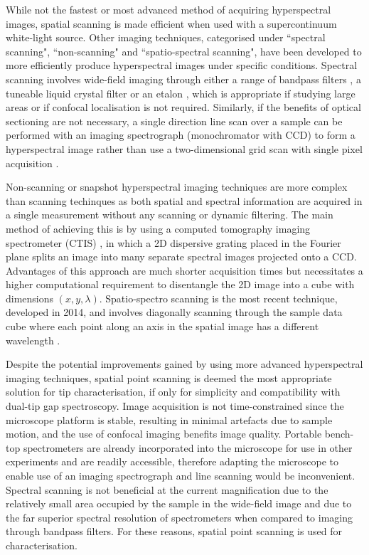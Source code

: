 \documentclass{article}
\begin{document}
While not the fastest or most advanced method of acquiring hyperspectral images, spatial scanning is made efficient when used with a supercontinuum white-light source. Other imaging techniques, categorised under ``spectral scanning", ``non-scanning" and ``spatio-spectral scanning", have been developed to more efficiently produce hyperspectral images under specific conditions.
Spectral scanning involves wide-field imaging through either a range of bandpass filters \cite{iga2012development}, a tuneable liquid crystal filter \cite{slawson1999hyperspectral, gat2000imaging} or an etalon \cite{daly2000tunable}, which is appropriate if studying large areas or if confocal localisation is not required. Similarly, if the benefits of optical sectioning are not necessary, a single direction line scan over a sample can be performed with an imaging spectrograph (monochromator with CCD) to form a hyperspectral image rather than use a two-dimensional grid scan with single pixel acquisition \cite{schultz2001hyperspectral}.

Non-scanning or snapshot hyperspectral imaging techniques are more complex than scanning techinques as both spatial and spectral information are acquired in a single measurement without any scanning or dynamic filtering. The main method of achieving this is by using a computed tomography imaging spectrometer (CTIS) \cite{okamoto1991simultaneous, bulygin1992spectrotomography, okamoto1993simultaneous, descour1995computed}, in which a 2D dispersive grating placed in the Fourier plane splits an image into many separate spectral images projected onto a CCD. Advantages of this approach are much shorter acquisition times but necessitates a higher computational requirement to disentangle the 2D image into a cube with dimensions $(x,y,\lambda)$.
Spatio-spectro scanning is the most recent technique, developed in 2014, and involves diagonally scanning through the sample data cube where each point along an axis in the spatial image has a different wavelength \cite{grusche2014basic}. %

Despite the potential improvements gained by using more advanced hyperspectral imaging techniques, spatial point scanning is deemed the most appropriate solution for tip characterisation, if only for simplicity and compatibility with dual-tip gap spectroscopy. Image acquisition is not time-constrained since the microscope platform is stable, resulting in minimal artefacts due to sample motion, and the use of confocal imaging benefits image quality. Portable bench-top spectrometers are already incorporated into the microscope for use in other experiments and are readily accessible, therefore adapting the microscope to enable use of an imaging spectrograph and line scanning would be inconvenient. Spectral scanning is not beneficial at the current magnification due to the relatively small area occupied by the sample in the wide-field image and due to the far superior spectral resolution of spectrometers when compared to imaging through bandpass filters. For these reasons, spatial point scanning is used for characterisation.

\end{document}
